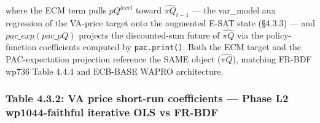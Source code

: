 \documentclass[
]{article}
\begin{document}
where the ECM term pulls \(pQ^{level}\) toward \(\widehat{\pi Q}_{t-1}\)
--- the var\_model aux regression of the VA-price target onto the
augmented E-SAT state (§4.3.3) --- and \(pac\_exp(pac\_pQ)\) projects
the discounted-sum future of \(\widehat{\pi Q}\) via the policy-function
coefficients computed by \texttt{pac.print()}. Both the ECM target and
the PAC-expectation projection reference the SAME object
(\(\widehat{\pi Q}\)), matching FR-BDF wp736 Table 4.4.4 and ECB-BASE
WAPRO architecture.

\subsubsection{Table 4.3.2: VA price short-run coefficients --- Phase L2
wp1044-faithful iterative OLS vs
FR-BDF}\label{table-4.3.2-va-price-short-run-coefficients-phase-l2-wp1044-faithful-iterative-ols-vs-fr-bdf}
\end{document}
